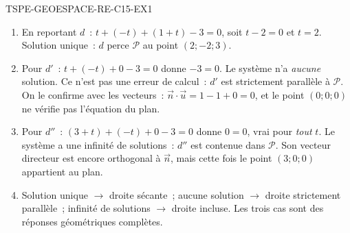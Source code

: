 \begin{corrige}{TSPE-GEOESPACE-RE-C15-EX1}
\begin{enumerate}
  \item En reportant $d$~: $t+(-t)+(1+t)-3=0$, soit $t-2=0$ et $t=2$. Solution
        unique~: $d$ perce $\mathcal{P}$ au point $(2;-2;3)$.
  \item Pour $d'$~: $t+(-t)+0-3=0$ donne $-3=0$. Le système n'a
        \emph{aucune} solution. Ce n'est pas une erreur de calcul~: $d'$ est
        strictement parallèle à $\mathcal{P}$. On le confirme avec les
        vecteurs~: $\vec{n}\cdot\vec{u}=1-1+0=0$, et le point $(0;0;0)$ ne
        vérifie pas l'équation du plan.
  \item Pour $d''$~: $(3+t)+(-t)+0-3=0$ donne $0=0$, vrai pour \emph{tout}
        $t$. Le système a une infinité de solutions~: $d''$ est contenue dans
        $\mathcal{P}$. Son vecteur directeur est encore orthogonal à
        $\vec{n}$, mais cette fois le point $(3;0;0)$ appartient au plan.
  \item Solution unique $\rightarrow$ droite sécante~; aucune solution
        $\rightarrow$ droite strictement parallèle~; infinité de solutions
        $\rightarrow$ droite incluse. Les trois cas sont des réponses
        géométriques complètes.
\end{enumerate}
\end{corrige}
